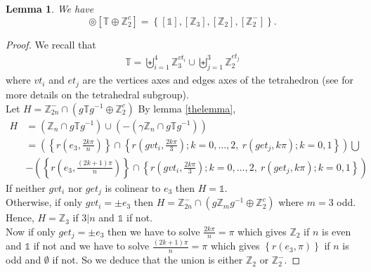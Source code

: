 \documentclass[11pt,a4paper]{amsart}
\newtheorem{lem}[thm]{Lemma}
\theoremstyle{definition}
\newcommand{\ZZ}{\mathbb{Z}}                %
\newcommand{\tetra}{\mathbb{T}}             %
\newcommand{\1}{\mathds{1}}		            %
\newcommand{\set}[1]{\left\{#1\right\}}     %
\begin{document}
\begin{lem}
We have
\begin{equation*}
[\ZZ_{2n}^-]\circledcirc [\tetra\oplus\ZZ_2^c]=\set{[\1],[\ZZ_3],[\ZZ_2],[\ZZ_2^-]}.
\end{equation*}
\end{lem}
\begin{proof}
We recall that
\begin{align*}
\tetra= \displaystyle \biguplus_{i=1}^4 \ZZ_3^{vt_i}\cup \biguplus_{j=1}^3 \ZZ_2^{et_j}
\end{align*}
where $vt_i$ and $et_j$ are the vertices axes and edges axes of the tetrahedron (see \cite[Appendix A]{olive2019} for more details on the tetrahedral subgroup).\\
Let $H=\ZZ_{2n}^- \cap (g\tetra g^{-1}\oplus \ZZ_2^c)$
By lemma \ref{thelemma},
\begin{align*}
H&=(\ZZ_n\cap g \tetra g^{-1})\cup (-(\gamma\ZZ_n\cap g \tetra g^{-1}))\\
 &=\left(\set{r(e_3,\frac{2k\pi}{n})}\cap \set{r(g vt_i,\frac{2k\pi}{3});k=0,\dotsc, 2,\ r(g et_j,k\pi); k=0,1}\right)\bigcup\\
 &-\left(\set{r(e_3,\frac{(2k+1)\pi}{n})}\cap \set{r(g vt_i,\frac{2k\pi}{3});k=0,\dotsc, 2,\ r(g et_j,k\pi); k=0,1}\right)
\end{align*}
If neither $gvt_i$ nor $get_j$ is colinear to $e_3$ then $H=\1$.\\
Otherwise, if only $gvt_i=\pm e_3$ then $H=\ZZ_{2n}^- \cap (g\ZZ_m g^{-1}\oplus \ZZ_2^c)$ where $m=3$ odd. Hence, $H=\ZZ_3$ if $3|n$ and $\1$ if not.
\\Now if only $get_j=\pm e_3$ then we have to solve $\displaystyle \frac{2k\pi}{n}=\pi$ which gives $\ZZ_2$ if $n$ is even and $\1$ if not and we have to solve $\displaystyle \frac{(2k+1)\pi}{n}=\pi$ which gives $\set{r(e_3,\pi)}$ if $n$ is odd and $\emptyset$ if not. So we deduce that the union is either $\ZZ_2$ or $\ZZ_2^-$.
\end{proof}
\end{document}
